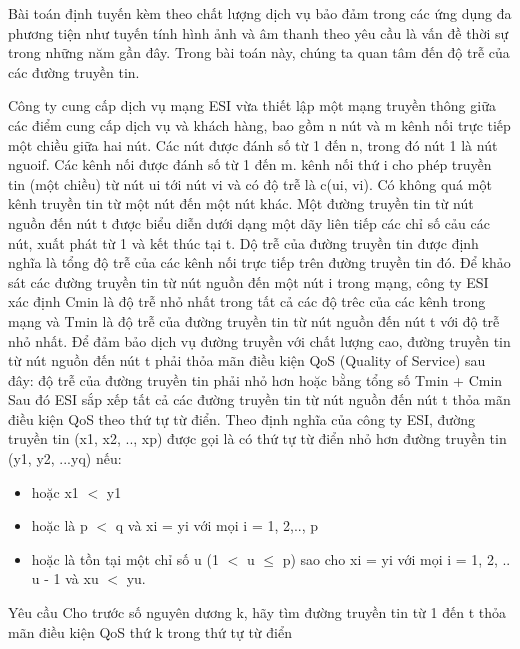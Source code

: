 Bài toán định tuyến kèm theo chất lượng dịch vụ bảo đảm trong các ứng dụng đa phương tiện như tuyến tính hình ảnh và âm thanh theo yêu cầu là vấn đề thời sự trong những năm gần đây. Trong bài toán này, chúng ta quan tâm đến độ trễ của các đường truyền tin.

Công ty cung cấp dịch vụ mạng ESI vừa thiết lập một mạng truyền thông giữa các điểm cung cấp dịch vụ và khách hàng, bao gồm n nút và m kênh nối trực tiếp một chiều giữa hai nút. Các nút được đánh số từ 1 đến n, trong đó nút 1 là nút nguoif. Các kênh nối được đánh số từ 1 đến m. kênh nối thứ i cho phép truyền tin (một chiều) từ nút ui tới nút vi và có độ trễ là c(ui, vi). Có không quá một kênh truyền tin từ một nút đến một nút khác. Một đường truyền tin từ nút nguồn đến nút t được biểu diễn dưới dạng một dãy liên tiếp các chỉ số cảu các nút, xuất phát từ 1 và kết thúc tại t. Dộ trễ của đường truyền tin được định nghĩa là tổng độ trễ của các kênh nối trực tiếp trên đường truyền tin đó. Để khảo sát các đường truyền tin từ nút nguồn đến một nút i trong mạng, công ty ESI xác định Cmin là độ trễ nhỏ nhất trong tất cả các độ trêc của các kênh trong mạng và Tmin là độ trễ của đường truyền tin từ nút nguồn đến nút t với độ trễ nhỏ nhất. Để đảm bảo dịch vụ đường truyền với chất lượng cao, đường truyền tin từ nút nguồn đến nút t phải thỏa mãn điều kiện QoS (Quality of Service) sau đây: độ trễ của đường truyền tin phải nhỏ hơn hoặc bằng tổng số Tmin + Cmin Sau đó ESI sắp xếp tất cả các đường truyền tin từ nút nguồn đến nút t thỏa mãn điều kiện QoS theo thứ tự từ điển. Theo định nghĩa của công ty ESI, đường truyền tin (x1, x2, .., xp) được gọi là có thứ tự từ điển nhỏ hơn đường truyền tin (y1, y2, ...yq) nếu:
\begin{itemize}
	\item hoặc x1 $<$ y1
	\item hoặc là p $<$ q và xi = yi với mọi i = 1, 2,.., p
	\item hoặc là tồn tại một chỉ số u (1 $<$ u  $\le$  p) sao cho xi = yi với mọi i = 1, 2, .. u - 1 và xu $<$ yu.
\end{itemize}
Yêu cầu
Cho trước số nguyên dương k, hãy tìm đường truyền tin từ 1 đến t thỏa mãn điều kiện QoS thứ k trong thứ tự từ điển